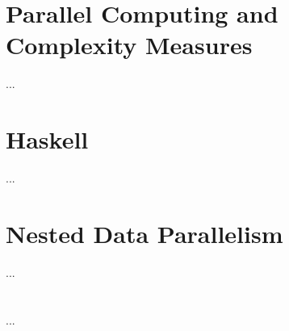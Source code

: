 
\section{Parallel Computing and Complexity Measures}
  ...
\section{Haskell}
  ...
\section{Nested Data Parallelism}
  ...
\section{\algo}
  ...
